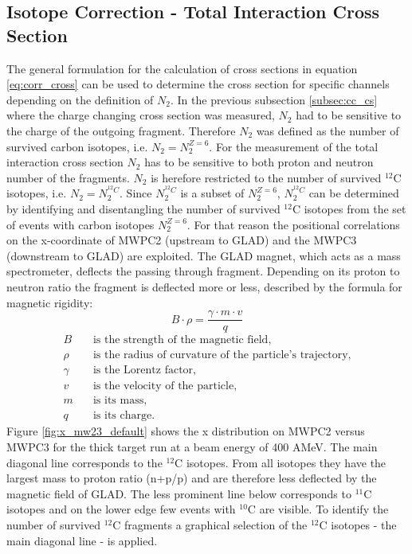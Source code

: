 \subsection{Isotope Correction - Total Interaction Cross Section}
The general formulation for the calculation of cross sections in equation \ref{eq:corr_cross} can be used to determine the cross section for specific channels depending on the definition of $N_2$. In the previous subsection \ref{subsec:cc_cs} where the charge changing cross section was measured, $N_2$ had to be sensitive to the charge of the outgoing fragment. Therefore $N_2$  was  defined as the number of survived carbon isotopes, i.e. $N_2 = N_2^{Z=6}$. For the measurement of the total interaction cross section $N_2$ has to be sensitive to both proton and neutron number of the fragments. $N_2$ is herefore restricted to the number of survived  $^{12}$C isotopes, i.e. $N_2 = N_2^{^{12}C}$. Since $N_2^{^{12}C}$ is a subset of $N_2^{Z=6}$, $N_2^{^{12}C}$ can be determined by identifying and disentangling the number of survived $^{12}$C isotopes from the set of events with carbon isotopes $N_2^{Z=6}$. For that reason the positional correlations on the x-coordinate of MWPC2 (upstream to GLAD) and the MWPC3 (downstream to GLAD) are exploited. The GLAD magnet, which acts as a mass spectrometer, deflects the passing through fragment. Depending on its proton to neutron ratio the fragment is deflected more or less, described by the formula for magnetic rigidity:\newline
\begin{equation}
B\cdot \rho = \frac{\gamma \cdot m \cdot v}{q}
\end{equation}
\begin{align*}
    B &\quad \text{is the strength of the magnetic field,} \\
    \rho &\quad \text{is the radius of curvature of the particle's trajectory,} \\
    \gamma &\quad \text{is the Lorentz factor,} \\
    v &\quad \text{is the velocity of the particle,} \\
    m &\quad \text{is its mass,} \\
    q &\quad \text{is its charge.}
\end{align*}
Figure \ref{fig:x_mw23_default} shows the x distribution on MWPC2 versus MWPC3 for the thick target run at a beam energy of 400 AMeV. The main diagonal line corresponds to the $^{12}$C isotopes. From all isotopes they have the largest mass to proton ratio (n+p/p) and are therefore less deflected by the magnetic field of GLAD. The less prominent line below corresponds to $^{11}$C isotopes and on the lower edge few events with $^{10}$C are visible. To identify the number of survived $^{12}$C fragments a graphical selection of the $^{12}$C isotopes - the main diagonal line - is applied.\newline

